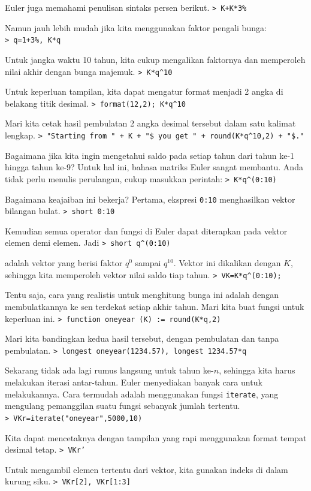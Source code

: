 \documentclass[11pt, a4paper]{article}
\newcommand{\emtcmd}[1]{\noindent\texttt{\textcolor{emtcommand}{>}\ #1}\par\smallskip}
\begin{document}
Euler juga memahami penulisan sintaks persen berikut.
\emtcmd{K+K*3\%}

Namun jauh lebih mudah jika kita menggunakan faktor pengali bunga:
\emtcmd{q=1+3\%, K*q}

Untuk jangka waktu 10 tahun, kita cukup mengalikan faktornya dan memperoleh nilai akhir dengan bunga majemuk.
\emtcmd{K*q\^{}10}

Untuk keperluan tampilan, kita dapat mengatur format menjadi 2 angka di belakang titik desimal.
\emtcmd{format(12,2); K*q\^{}10}

Mari kita cetak hasil pembulatan 2 angka desimal tersebut dalam satu kalimat lengkap.
\emtcmd{"Starting from " + K + "\$ you get " + round(K*q\^{}10,2) + "\$."}

Bagaimana jika kita ingin mengetahui saldo pada setiap tahun dari tahun ke-1 hingga tahun ke-9? Untuk hal ini, bahasa matriks Euler sangat membantu. Anda tidak perlu menulis perulangan, cukup masukkan perintah:
\emtcmd{K*q\^{}(0:10)}

Bagaimana keajaiban ini bekerja? Pertama, ekspresi \texttt{0:10} menghasilkan vektor bilangan bulat.
\emtcmd{short 0:10}

Kemudian semua operator dan fungsi di Euler dapat diterapkan pada vektor elemen demi elemen. Jadi
\emtcmd{short q\^{}(0:10)}

adalah vektor yang berisi faktor $q^0$ sampai $q^{10}$. Vektor ini dikalikan dengan $K$, sehingga kita memperoleh vektor nilai saldo tiap tahun.
\emtcmd{VK=K*q\^{}(0:10);}

Tentu saja, cara yang realistis untuk menghitung bunga ini adalah dengan membulatkannya ke sen terdekat setiap akhir tahun. Mari kita buat fungsi untuk keperluan ini.
\emtcmd{function oneyear (K) := round(K*q,2)}

Mari kita bandingkan kedua hasil tersebut, dengan pembulatan dan tanpa pembulatan.
\emtcmd{longest oneyear(1234.57), longest 1234.57*q}

Sekarang tidak ada lagi rumus langsung untuk tahun ke-$n$, sehingga kita harus melakukan iterasi antar-tahun. Euler menyediakan banyak cara untuk melakukannya. Cara termudah adalah menggunakan fungsi \texttt{iterate}, yang mengulang pemanggilan suatu fungsi sebanyak jumlah tertentu.
\emtcmd{VKr=iterate("oneyear",5000,10)}

Kita dapat mencetaknya dengan tampilan yang rapi menggunakan format tempat desimal tetap.
\emtcmd{VKr'}

Untuk mengambil elemen tertentu dari vektor, kita gunakan indeks di dalam kurung siku.
\emtcmd{VKr[2], VKr[1:3]}
\end{document}
